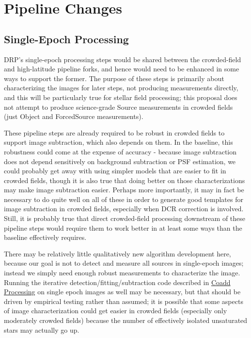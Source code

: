 \documentclass[DM,authoryear,toc]{lsstdoc}
\begin{document}
\section{Pipeline Changes}

\subsection{Single-Epoch Processing}
\label{sec:single-epoch-processing}

DRP's single-epoch processing steps would be shared between the crowded-field and high-latitude pipeline forks, and hence would need to be enhanced in some ways to support the former.
The purpose of these steps is primarily about characterizing the images for later steps, not producing measurements directly, and this will be particularly true for stellar field processing; this proposal does not attempt to produce science-grade Source measurements in crowded fields (just Object and ForcedSource measurements).

These pipeline steps are already required to be robust in crowded fields to support image subtraction, which also depends on them.
In the baseline, this robustness could come at the expense of accuracy - because image subtraction does not depend sensitively on background subtraction or PSF estimation, we could probably get away with using simpler models that are easier to fit in crowded fields, though it is also true that doing better on those characterizations may make image subtraction easier.
Perhaps more importantly, it may in fact be necessary to do quite well on all of these in order to generate good templates for image subtraction in crowded fields, especially when DCR correction is involved.  Still, it is probably true that direct crowded-field processing downstream of these pipeline steps would require them to work better in at least some ways than the baseline effectively requires.

There may be relatively little qualitatively new algorithm development here, because our goal is not to detect and measure all sources in single-epoch images; instead we simply need enough robust measurements to characterize the image.
Running the iterative detection/fitting/subtraction code described in \hyperref[sec:coadd-processing]{Coadd Processing} on single epoch images as well may be necessary, but that should be driven by empirical testing rather than assumed; it is possible that some aspects of image characterization could get easier in crowded fields (especially only moderately crowded fields) because the number of effectively isolated unsaturated stars may actually go up.
\end{document}
